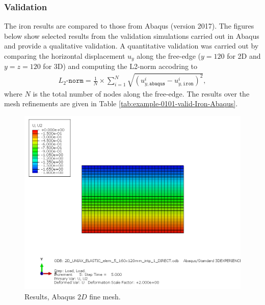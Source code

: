 \subsubsection{Validation}
%
The iron results are compared to those from Abaqus (version 2017). The figures below show selected results from the validation simulations carried out in Abaqus and provide a qualitative validation. A quantitative validation was carried out by comparing the horizontal displacement $u_y$ along the free-edge ($y=120$ for 2D and $y=z=120$ for 3D) and computing the L2-norm accodring to
\begin{align}
    L_2\texttt{-norm} = \frac{1}{N} \times  \sum_{i=1}^{N} \sqrt{\left(u_{y,\texttt{abaqus}}^i-u_{y,\texttt{iron}}^i  \right)^2},
\end{align}
where $N$ is the total number of nodes along the free-edge. The results over the mesh refinements are given in Table \ref{tab:example-0101-valid-Iron-Abaqus}.
%
\begin{figure}[h!]
    \centering 
    \includegraphics[width=\columnwidth]{examples/example-0101/doc/figures/2D_UNIAX_ELASTIC_elem_5_160x120mm_intp_1_DIRECTU2.png} 
    \caption{Results, Abaqus $2D$ fine mesh.}
    \label{example-0101-abaqus-2D-fig}
\end{figure}
%
